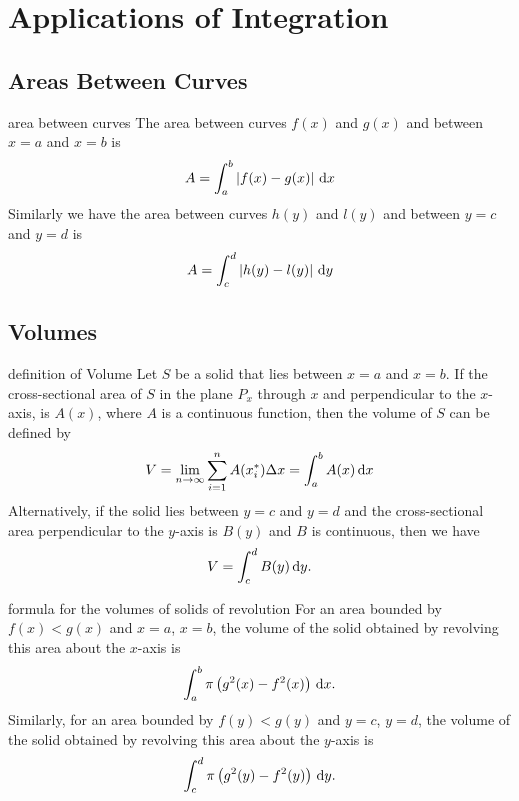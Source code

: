 \documentclass[Calculus 1 Recitation.tex]{subfiles}
\begin{document}
\section{Applications of Integration}
\subsection{Areas Between Curves}

\begin{myleftlinebox}
	area between curves
	\tcblower
	The area between curves $f(x)$ and $g(x)$ and between $x=a$ and $x=b$ is 
	\[A=\int_a^b \left\vert f(x)-g(x)\right\vert\,\mathrm{d} x\]
	Similarly we have the area between curves $h(y)$ and $l(y)$ and between $y=c$ and $y=d$ is
	\[A = \int_c^d \left\vert h(y)-l(y)\right\vert\,\mathrm{d} y\]
\end{myleftlinebox}

\subsection{Volumes}
\begin{myleftlinebox}
	definition of Volume
	\tcblower
	Let $S$ be a solid that lies between $x=a$ and $x=b$. If the cross-sectional area of $S$ in the plane $P_x$ through $x$ and perpendicular to the $x$-axis, is $A(x)$, where $A$ is a continuous function, then the volume of $S$ can be defined by
	\[V = \lim_{n\to\infty} \sum_{i=1}^n A(x_i^*)\Delta x=\int_a^b A(x)\,\mathrm{d} x\]
	Alternatively, if the solid lies between $y=c$ and $y=d$ and the cross-sectional area perpendicular to the $y$-axis is $B(y)$ and $B$ is continuous, then we have \[V = \int_c^d B(y)\,\mathrm{d} y.\]
\end{myleftlinebox}

\begin{myleftlinebox}
	formula for the volumes of solids of revolution
	\tcblower
	For an area bounded by $f(x)<g(x)$ and $x=a$, $x=b$, the volume of the solid obtained by revolving this area about the $x$-axis is
	\[\int_a^b \pi \left( g^2(x)-f^2(x) \right)\,\mathrm{d} x.\]
	Similarly, for an area bounded by $f(y)<g(y)$ and $y=c$, $y=d$, the volume of the solid obtained by revolving this area about the $y$-axis is
	\[\int_c^d \pi \left( g^2(y)-f^2(y) \right)\,\mathrm{d} y.\]
\end{myleftlinebox}\
\end{document}

